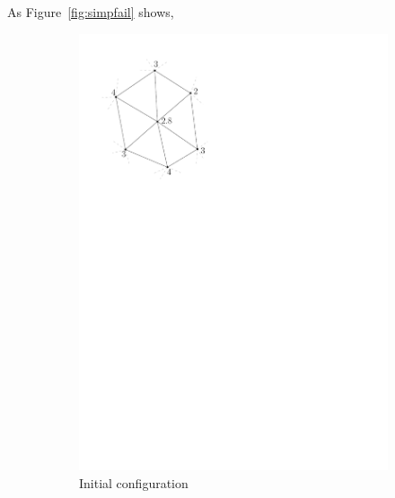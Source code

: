 As Figure~\ref{fig:simpfail} shows, 
\begin{figure}
\centering
  \begin{subfigure}[b]{0.22\linewidth}
    \centering
    \includegraphics[width=\textwidth,page=1]{figs/simpfail.pdf}
    \caption{Initial configuration}\label{fig:simpfail:a}
  \end{subfigure}
  \qquad
  \begin{subfigure}[b]{0.22\linewidth}
    \centering

\end{subfigure}
\end{figure}
